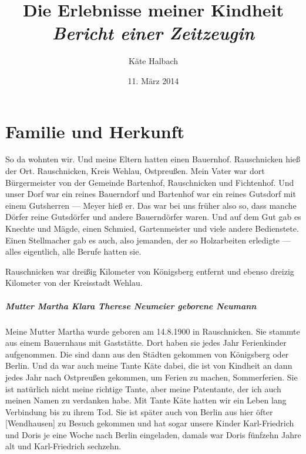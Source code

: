 \documentclass[12pt, twoside]{book}
\begin{document}
\title{Die Erlebnisse meiner Kindheit\\ \emph{Bericht einer Zeitzeugin}}
\author{Käte Halbach}
\date{11. März 2014}

\makeatletter
\def\cleardoublepage{\clearpage\if@twoside \ifodd\c@page\else
    \vspace*{\fill}
    \thispagestyle{empty}
    \newpage
    \if@twocolumn\hbox{}\newpage\fi\fi\fi}
\makeatother

\maketitle

\chapter{Familie und Herkunft}
\pagestyle{fancy}

So da wohnten wir. Und meine Eltern hatten einen Bauernhof.
Rauschnicken hieß der Ort. Rauschnicken, Kreis Wehlau, Ostpreußen.
Mein Vater war dort Bürgermeister von der Gemeinde Bartenhof, Rauschnicken und Fichtenhof.
Und unser Dorf war ein reines Bauerndorf und Bartenhof war ein reines Gutsdorf mit einem Gutsherren --- Meyer hieß er.
Das war bei uns früher also so, dass manche Dörfer reine Gutsdörfer und andere Bauerndörfer waren.
Und auf dem Gut gab es Knechte und Mägde, einen Schmied, Gartenmeister und viele andere Bedienstete.
Einen Stellmacher gab es auch, also jemanden, der so Holzarbeiten erledigte --- alles eigentlich, alle Berufe hatten sie.

Rauschnicken war dreißig Kilometer von Königsberg entfernt und ebenso dreizig Kilometer von der Kreisstadt Wehlau.

\paragraph{Mutter Martha Klara Therese Neumeier geborene Neumann}

Meine Mutter Martha wurde geboren am 14.8.1900 in Rauschnicken.
Sie stammte aus einem Bauernhaus mit Gaststätte. Dort haben sie jedes Jahr Ferienkinder aufgenommen.
Die sind dann aus den Städten gekommen von Königsberg oder Berlin. Und da war auch meine Tante Käte dabei, die ist von Kindheit an dann jedes Jahr nach Ostpreußen gekommen, um Ferien zu machen, Sommerferien.
Sie ist natürlich nicht meine richtige Tante, aber meine Patentante, der ich auch meinen Namen zu verdanken habe.
Mit Tante Käte hatten wir ein Leben lang Verbindung bis zu ihrem Tod. Sie ist später auch von Berlin aus hier öfter [Wendhausen] zu Besuch gekommen und hat sogar unsere Kinder Karl-Friedrich und Doris je eine Woche nach Berlin eingeladen, damals war Doris fünfzehn Jahre alt und Karl-Friedrich sechzehn.
\end{document}
